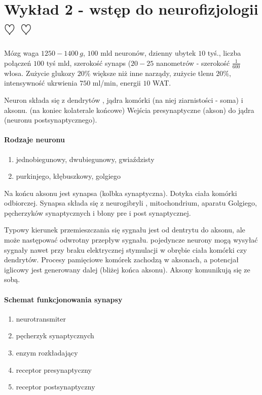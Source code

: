 \section{Wykład 2 - wstęp do neurofizjologii $\heartsuit$ $\heartsuit$}

Mózg waga $1250 - 1400\ g$, $100$ mld neuronów, dzienny ubytek $10$ tyś., liczba połączeń $100$ tyś mld,
szerokość synaps ($20-25$ nanometrów - szerokość $\frac{1}{600}$ włosa. Zużycie glukozy $20\%$ większe
niż inne narządy, zużycie tlenu $20\%$, intensywność ukrwienia $750$ ml/min, energii $10$ WAT.

Neuron składa się z dendrytów , jądra komórki (na niej ziarnistości - soma) i aksonu. (na koniec kolaterale końcowe)
Wejścia presynaptyczne (akson) do jądra (neuronu postsynaptycznego).

\paragraph{Rodzaje neuronu}

\begin{enumerate}
 \item jednobiegunowy, dwubiegunowy, gwiaździsty
 \item purkinjego, kłębuszkowy, golgiego
\end{enumerate}

Na końcu aksonu jest synapsa (kolbka synaptyczna). Dotyka ciała komórki odbiorczej. Synapsa składa
się z neurogibryli , mitochondrium, aparatu Golgiego, pęcherzyków synaptycznych i błony pre i post synaptycznej.

Typowy kierunek przemieszczania się sygnału jest od dentrytu do aksonu, ale może następować odwrotny przepływ sygnału.
pojedyncze neurony mogą wysyłać sygnały nawet przy braku
elektrycznej stymulacji w obrębie ciała komórki czy dendrytów.
Procesy pamięciowe komórek zachodzą w aksonach, a potencjał iglicowy jest generowany dalej (bliżej końca aksonu).
Aksony komunikują się ze sobą. 

\paragraph{Schemat funkcjonowania synapsy}

\begin{enumerate}
 \item neurotransmiter
 \item pęcherzyk synaptycznych
 \item enzym rozkładający
 \item receptor presynaptyczny
 \item receptor postsynaptyczny
\end{enumerate}

